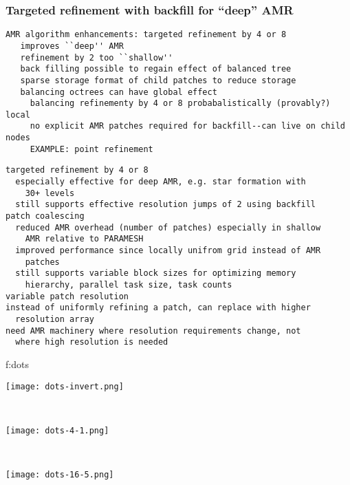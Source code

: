 \documentclass[14pt,letter]{article}
\begin{document}
\subsubsection{Targeted refinement with backfill for ``deep'' AMR} \label{sss:targeted-refinement}

\begin{verbatim}
AMR algorithm enhancements: targeted refinement by 4 or 8
   improves ``deep'' AMR
   refinement by 2 too ``shallow''
   back filling possible to regain effect of balanced tree
   sparse storage format of child patches to reduce storage 
   balancing octrees can have global effect
     balancing refinementy by 4 or 8 probabalistically (provably?) local
     no explicit AMR patches required for backfill--can live on child nodes 
     EXAMPLE: point refinement
\end{verbatim}

\begin{verbatim}
targeted refinement by 4 or 8
  especially effective for deep AMR, e.g. star formation with
    30+ levels
  still supports effective resolution jumps of 2 using backfill
patch coalescing
  reduced AMR overhead (number of patches) especially in shallow
    AMR relative to PARAMESH
  improved performance since locally unifrom grid instead of AMR
    patches
  still supports variable block sizes for optimizing memory
    hierarchy, parallel task size, task counts
variable patch resolution
instead of uniformly refining a patch, can replace with higher
  resolution array
need AMR machinery where resolution requirements change, not
  where high resolution is needed
\end{verbatim}

{f:dots}{
\begin{minipage}{7.0in}
\begin{minipage}{2.2in}
\texttt{[image: dots-invert.png]}
\end{minipage} \ 
\begin{minipage}{2.2in}
\texttt{[image: dots-4-1.png]}
\end{minipage} \ 
\begin{minipage}{2.2in}
\texttt{[image: dots-16-5.png]}
\end{minipage}
\end{minipage}}
\end{document}
